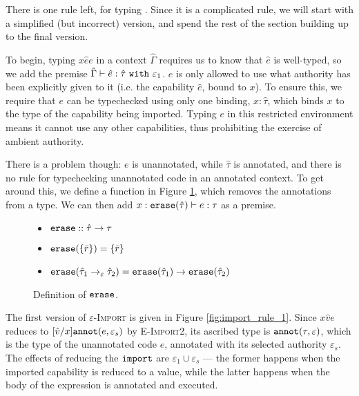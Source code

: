 There is one rule left, for typing . Since it is a complicated
rule, we will start with a simplified (but incorrect) version, and spend the
rest of the section building up to the final version.

To begin, typing ${x}{\hat e}{e}$ in a context
$\hat \Gamma$ requires us to know that $\hat e$ is
well-typed, so we add the premise
$\hat \Gamma \vdash \hat e: \hat \tau~\mathtt{with}~ \varepsilon_1$.
$e$ is only allowed to use what authority has been explicitly given to it
(i.e. the capability $\hat e$, bound to $x$). To ensure this, we require
that $e$ can be typechecked using only one binding, $x: \hat \tau$,
which binds $x$ to the type of the capability being imported.
Typing $e$ in this restricted environment means it cannot use any
other capabilities, thus prohibiting the exercise of ambient authority.

There is a problem though: $e$ is unannotated, while $\hat \tau$ is
annotated, and there is no rule for typechecking unannotated code in
an annotated context. To get around this, we define a function
 in Figure \ref{fig:erase_defn}, which removes the
annotations from a type. We can then add
$x: \mathtt{erase}(\hat \tau) \vdash e: \tau$ as a premise.

\begin{figure}
\vspace*{-5mm}
\begin{itemize}
	\setlength\itemsep{-0.2em}
\item[] $\mathtt{erase} :: \hat \tau \rightarrow \tau$
	\item[] $\mathtt{erase}(\{ \bar r \}) = \{ \bar r \}$
	\item[] $\mathtt{erase}(\hat \tau_1 \rightarrow_{\varepsilon} \hat \tau_2) = \mathtt{erase}(\hat \tau_1) \rightarrow \mathtt{erase}(\hat \tau_2)$
\end{itemize}
\vspace*{-5mm}
\caption{Definition of $\mathtt{erase}$.}
\vspace*{-5mm}
\label{fig:erase_defn}
\end{figure}

The first version of \textsc{$\varepsilon$-Import} is given in Figure
\ref{fig:import_rule_1}. Since
${x}{\hat v}{e}$ reduces to $[\hat
v/x]\mathtt{annot}(e, \varepsilon_s)$ by \textsc{E-Import2}, its ascribed type is $\mathtt{annot}(\tau, \varepsilon)$, which is the type of the unannotated
code $e$, annotated with its selected authority $\varepsilon_s$. The
effects of reducing the $\mathtt{import}$ are $\varepsilon_1 \cup \varepsilon_s$
--- the former happens when the imported capability is reduced to a value,
while the latter happens when the body of the  expression is
annotated and executed.

